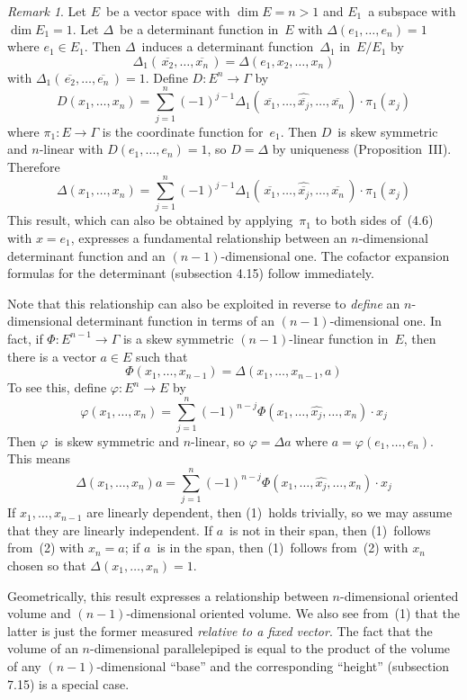 \documentclass[letterpaper,12pt]{article}
\newcommand{\mult}{\cdot}
\newcommand{\delete}{\widehat}
\newcommand{\proj}[1]{\overline{#1}}
\theoremstyle{definition}
\theoremstyle{remark}
\newtheorem*{rmk}{Remark}
\begin{document}
\begin{rmk}
Let \(E\)~be a vector space with \(\dim E=n>1\) and \(E_1\)~a subspace with \(\dim E_1=1\). Let \(\Delta\)~be a determinant function in~\(E\) with \(\Delta(e_1,\ldots,e_n)=1\) where \(e_1\in E_1\). Then \(\Delta\)~induces a determinant function~\(\Delta_1\) in~\(E/E_1\) by
\[\Delta_1(\,\proj{x_2},\ldots,\proj{x_n}\,)=\Delta(e_1,x_2,\ldots,x_n)\]
with \(\Delta_1(\,\proj{e_2},\ldots,\proj{e_n}\,)=1\). Define \(D:E^n\to\Gamma\) by
\[D(x_1,\ldots,x_n)=\sum_{j=1}^n (-1)^{j-1}\Delta_1(\,\proj{x_1},\ldots,\delete{\proj{x_j}},\ldots,\proj{x_n}\,)\mult\pi_1(x_j)\]
where \(\pi_1:E\to\Gamma\) is the coordinate function for~\(e_1\). Then \(D\)~is skew symmetric and \(n\)-linear with \(D(e_1,\ldots,e_n)=1\), so \(D=\Delta\) by uniqueness (Proposition~III). Therefore
\[\boxed{\Delta(x_1,\ldots,x_n)=\sum_{j=1}^n (-1)^{j-1}\Delta_1(\,\proj{x_1},\ldots,\delete{\proj{x_j}},\ldots,\proj{x_n}\,)\mult\pi_1(x_j)}\]
This result, which can also be obtained by applying~\(\pi_1\) to both sides of~(4.6) with \(x=e_1\), expresses a fundamental relationship between an \(n\)-dimensional determinant function and an \((n-1)\)-dimensional one. The cofactor expansion formulas for the determinant (subsection 4.15) follow immediately.

Note that this relationship can also be exploited in reverse to \emph{define} an \(n\)-dimensional determinant function in terms of an \((n-1)\)-dimensional one. In fact, if \(\Phi:E^{n-1}\to\Gamma\) is a skew symmetric \((n-1)\)-linear function in~\(E\), then there is a vector \(a\in E\) such that
\[\Phi(x_1,\ldots,x_{n-1})=\Delta(x_1,\ldots,x_{n-1},a)\tag{1}\]
To see this, define \(\varphi:E^n\to E\) by
\[\varphi(x_1,\ldots,x_n)=\sum_{j=1}^n (-1)^{n-j}\Phi(x_1,\ldots,\delete{x_j},\ldots,x_n)\mult x_j\]
Then \(\varphi\)~is skew symmetric and \(n\)-linear, so \(\varphi=\Delta a\) where \(a=\varphi(e_1,\ldots,e_n)\). This means
\[\Delta(x_1,\ldots,x_n)a=\sum_{j=1}^n (-1)^{n-j}\Phi(x_1,\ldots,\delete{x_j},\ldots,x_n)\mult x_j\tag{2}\]
If \(x_1,\ldots,x_{n-1}\) are linearly dependent, then (1)~holds trivially, so we may assume that they are linearly independent. If \(a\)~is not in their span, then (1)~follows from~(2) with \(x_n=a\); if \(a\)~is in the span, then (1)~follows from~(2) with \(x_n\) chosen so that \(\Delta(x_1,\ldots,x_n)=1\).

Geometrically, this result expresses a relationship between \(n\)-dimensional oriented volume and \((n-1)\)-dimensional oriented volume. We also see from~(1) that the latter is just the former measured \emph{relative to a fixed vector}. The fact that the volume of an \(n\)-dimensional parallelepiped is equal to the product of the volume of any \((n-1)\)-dimensional ``base'' and the corresponding ``height'' (subsection 7.15) is a special case.
\end{rmk}
\end{document}
